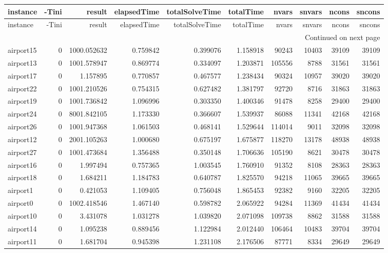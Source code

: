 
\begin{longtable}{|l|r|r|r|r|r|r|r|r|r|}
\toprule
instance & -Tini & result & elapsedTime & totalSolveTime & totalTime & nvars & snvars & ncons & sncons \\
\midrule
\endfirsthead
\toprule
instance & -Tini & result & elapsedTime & totalSolveTime & totalTime & nvars & snvars & ncons & sncons \\
\midrule
\endhead
\midrule
\multicolumn{10}{r}{Continued on next page} \\
\midrule
\endfoot
\bottomrule
\endlastfoot
airport15 & 0 & 1000.052632 & 0.759842 & 0.399076 & 1.158918 & 90243 & 10403 & 39109 & 39109 \\
airport13 & 0 & 1001.578947 & 0.869774 & 0.334097 & 1.203871 & 105556 & 8788 & 31561 & 31561 \\
airport17 & 0 & 1.157895 & 0.770857 & 0.467577 & 1.238434 & 90324 & 10957 & 39020 & 39020 \\
airport22 & 0 & 1001.210526 & 0.754315 & 0.627482 & 1.381797 & 92720 & 8716 & 31863 & 31863 \\
airport19 & 0 & 1001.736842 & 1.096996 & 0.303350 & 1.400346 & 91478 & 8258 & 29400 & 29400 \\
airport24 & 0 & 8001.842105 & 1.173330 & 0.366607 & 1.539937 & 86088 & 11341 & 42168 & 42168 \\
airport26 & 0 & 1001.947368 & 1.061503 & 0.468141 & 1.529644 & 114014 & 9011 & 32098 & 32098 \\
airport12 & 0 & 2001.105263 & 1.000680 & 0.675197 & 1.675877 & 118270 & 13178 & 48938 & 48938 \\
airport27 & 0 & 1001.473684 & 1.356488 & 0.350148 & 1.706636 & 105190 & 8621 & 30478 & 30478 \\
airport16 & 0 & 1.997494 & 0.757365 & 1.003545 & 1.760910 & 91352 & 8108 & 28363 & 28363 \\
airport18 & 0 & 1.684211 & 1.184783 & 0.640787 & 1.825570 & 94218 & 11065 & 39665 & 39665 \\
airport1 & 0 & 0.421053 & 1.109405 & 0.756048 & 1.865453 & 92382 & 9160 & 32205 & 32205 \\
airport0 & 0 & 1002.418546 & 1.467140 & 0.598782 & 2.065922 & 94284 & 11369 & 41434 & 41434 \\
airport10 & 0 & 3.431078 & 1.031278 & 1.039820 & 2.071098 & 109738 & 8862 & 31588 & 31588 \\
airport14 & 0 & 1.095238 & 0.889456 & 1.122984 & 2.012440 & 106464 & 10483 & 39704 & 39704 \\
airport11 & 0 & 1.681704 & 0.945398 & 1.231108 & 2.176506 & 87771 & 8334 & 29649 & 29649 \\

\end{longtable}
